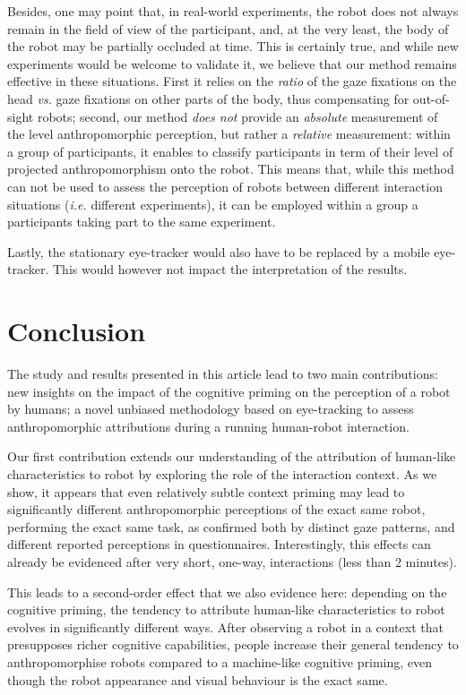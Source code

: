 \documentclass[lettersize, noapacite, twoside, HRI]{apa_HRI}
\newcommand{\ie}{\textit{i.e.}\xspace}
\newcommand{\vs}{\textit{vs.}\xspace}
\begin{document}
Besides, one may point that, in real-world experiments, the robot does not
always remain in the field of view of the participant, and, at the very least, the
body of the robot may be partially occluded at time.  This is certainly true,
and while new experiments would be welcome to validate it, we believe that our
method remains effective in these situations. First it relies on the
\emph{ratio} of the gaze fixations on the head \vs gaze fixations on other parts
of the body, thus compensating for out-of-sight robots; second, our method
\emph{does not} provide an \emph{absolute} measurement of the level
anthropomorphic perception, but rather a \emph{relative} measurement: within a
group of participants, it enables to classify participants in term of their level of
projected anthropomorphism onto the robot.  This means that, while this method
can not be used to assess the perception of robots between different interaction
situations (\ie different experiments), it can be employed within a group a
participants taking part to the same experiment.

Lastly, the stationary eye-tracker would also have to be replaced by a mobile
eye-tracker. This would however not impact the interpretation of the results.

\section{Conclusion}
\label{conclusion}

The study and results presented in this article lead to two main contributions:
new insights on the impact of the cognitive priming on the perception of a robot
by humans; a novel unbiased methodology based on eye-tracking to assess
anthropomorphic attributions during a running human-robot interaction.

Our first contribution extends our understanding of the attribution of
human-like characteristics to robot by exploring the role of the interaction
context. As we show, it appears that even relatively subtle context
priming may lead to significantly different anthropomorphic perceptions of
the exact same robot, performing the exact same task, as confirmed both by
distinct gaze patterns, and different reported perceptions in questionnaires.
Interestingly, this effects can already be evidenced after very short,
one-way, interactions (less than 2 minutes).

This leads to a second-order effect that we also evidence here: depending on the
cognitive priming, the tendency to attribute human-like characteristics to robot
evolves in significantly different ways. After observing a robot in a
context that presupposes richer cognitive capabilities, people increase
their general tendency to anthropomorphise robots compared to a machine-like
cognitive priming, even though the robot appearance and visual behaviour is the
exact same.
\end{document}
